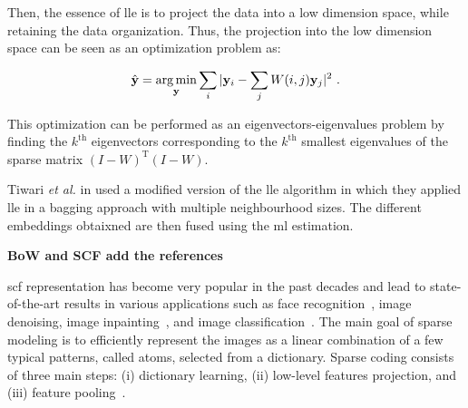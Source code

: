 Then, the essence of \ac{lle} is to project the data into a low dimension space, while retaining the data organization.
Thus, the projection into the low dimension space can be seen as an optimization problem as:

\begin{equation}
	\hat{\mathbf{y}} = \operatorname*{arg\,min}_{\mathbf{y}} \sum_i | \mathbf{y}_i - \sum_j W(i,j)\mathbf{y}_j |^{2} \ .
	\label{eq:lowprojlle}
\end{equation}

\noindent This optimization can be performed as an eigenvectors-eigenvalues problem by finding the $k^{\text{th}}$ eigenvectors corresponding to the $k^{\text{th}}$ smallest eigenvalues of the sparse matrix $(I-W)^{\text{T}}(I-W)$.


Tiwari \textit{et al.} in \cite{Tiwari2008} used a modified version of the \ac{lle} algorithm in which they applied \ac{lle} in a bagging approach with multiple neighbourhood sizes.
The different embeddings obtaixned are then fused using the \ac{ml} estimation.

{\color{red}\textbf{BoW and SCF add the references}}

\Ac{scf} representation has become very popular in the past decades and lead to state-of-the-art results in various applications such as face recognition~\cite{wright2009robust}, image denoising, image inpainting~\cite{elad2006image}, and image classification~\cite{sidibe2015discrimination,rastgo2016classification}.
The main goal of sparse modeling is to efficiently represent the images as a linear combination of a few typical patterns, called atoms, selected from a dictionary.
Sparse coding consists of three main steps: (i) dictionary learning, (ii) low-level features projection, and (iii) feature pooling~\cite{rubinstein2008efficient}.

